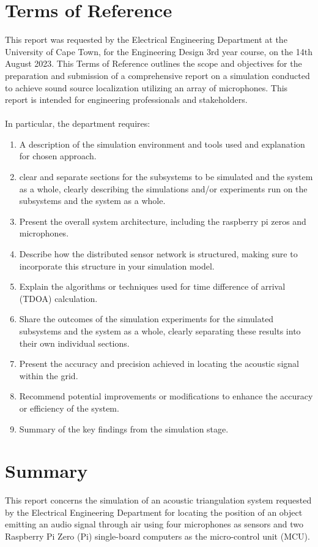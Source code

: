 \documentclass[a4paper,11pt]{article}
\begin{document}
\section*{Terms of Reference}
This report was requested by the Electrical Engineering Department at the University of Cape Town, for the Engineering Design 3rd year course, on the 14th August 2023. This Terms of Reference outlines the scope and objectives for the preparation and submission of a comprehensive report on a simulation conducted to achieve sound source localization utilizing an array of microphones. This report is intended for engineering professionals and stakeholders.
\\\\
In particular, the department requires:

\begin{enumerate}
	\item A description of the simulation environment and tools used and explanation for chosen approach.
	\item  clear and separate sections for the subsystems to be simulated and the
	system as a whole, clearly describing the simulations and/or experiments run
	on the subsystems and the system as a whole.
	\item Present the overall system architecture, including the raspberry pi zeros and
	microphones.
	\item Describe how the distributed sensor network is structured, making sure to
	incorporate this structure in your simulation model.
	\item Explain the algorithms or techniques used for time difference of arrival
	(TDOA) calculation.
	\item Share the outcomes of the simulation experiments for the simulated
	subsystems and the system as a whole, clearly separating these results into
	their own individual sections.
	\item Present the accuracy and precision achieved in locating the acoustic signal
	within the grid.
	\item Recommend potential improvements or modifications to enhance the accuracy or efficiency of the system.
	\item Summary of the key findings from the simulation stage.
\end{enumerate}

\clearpage

\section*{Summary}
This report concerns the simulation of an acoustic triangulation system requested by the Electrical Engineering Department for locating the position of an object emitting an audio signal through air using four microphones as sensors and two Raspberry Pi Zero (Pi) single-board computers as the micro-control unit (MCU). 
\end{document}
